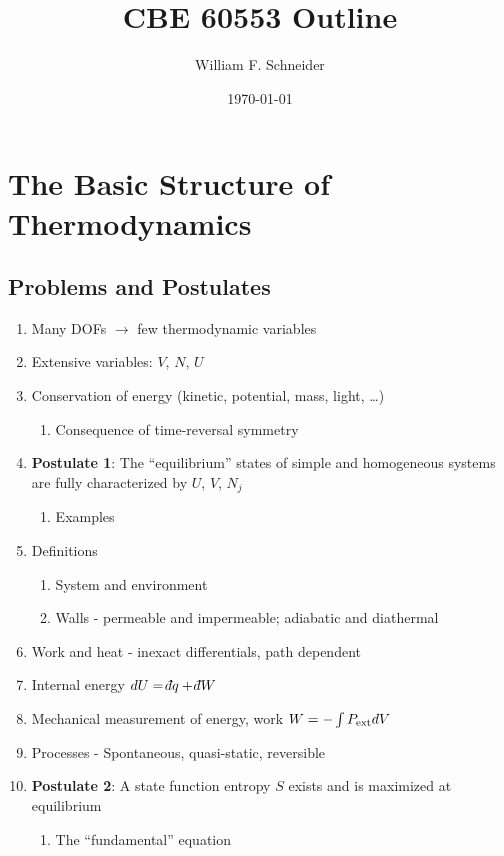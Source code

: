 \documentclass[11pt]{article}
\author{William F. Schneider}
\date{\today}
\title{CBE 60553 Outline}
\def\dbar{{\mathchar'26\mkern-12mu d}}
\begin{document}
\begin{OPTIONS}
\end{OPTIONS}
\section{The Basic Structure of Thermodynamics}
\label{sec:orgcc1b79b}
\subsection{Problems and Postulates}
\label{sec:orgf2c65f3}
\begin{enumerate}
\item Many DOFs \(\rightarrow\) few thermodynamic variables
\item Extensive variables: \(V\), \(N\), \(U\)
\item Conservation of energy (kinetic, potential, mass, light, \ldots{})
\begin{enumerate}
\item Consequence of time-reversal symmetry
\end{enumerate}

\item \textbf{Postulate 1}: The ``equilibrium'' states of simple and homogeneous
systems are fully characterized by \(U\), \(V\), \(N_j\)
\begin{enumerate}
\item Examples
\end{enumerate}

\item Definitions
\begin{enumerate}
\item System and environment
\item Walls - permeable and impermeable; adiabatic and diathermal
\end{enumerate}

\item Work and heat - inexact differentials, path dependent

\item Internal energy \(dU = \dbar q + \dbar W\)

\item Mechanical measurement of energy, work \(W = - \int P_{\rm ext} dV\)

\item Processes - Spontaneous, quasi-static, reversible

\item \textbf{Postulate 2}: A state function entropy \(S\) exists and is maximized at equilibrium
\begin{enumerate}
\item The ``fundamental'' equation
\end{enumerate}


\end{enumerate}
\end{document}
